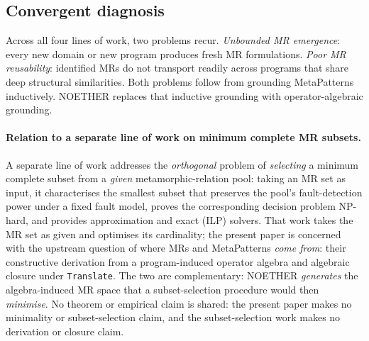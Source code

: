 \documentclass[acmsmall,screen,review]{acmart}
\begin{document}
\subsection{Convergent diagnosis}

Across all four lines of work, two problems recur. \emph{Unbounded MR emergence}: every new domain or new program produces fresh MR formulations. \emph{Poor MR reusability}: identified MRs do not transport readily across programs that share deep structural similarities. Both problems follow from grounding MetaPatterns inductively. NOETHER replaces that inductive grounding with operator-algebraic grounding.
\paragraph{Relation to a separate line of work on minimum complete MR subsets.}
A separate line of work addresses the
\emph{orthogonal} problem of \emph{selecting} a minimum complete subset from a
\emph{given} metamorphic-relation pool: taking an MR set as input, it
characterises the smallest subset that preserves the pool's fault-detection
power under a fixed fault model, proves the corresponding decision problem
NP-hard, and provides approximation and exact (ILP) solvers. That work takes
the MR set as given and optimises its cardinality; the present paper is
concerned with the upstream question of where MRs and MetaPatterns
\emph{come from}: their constructive derivation from a program-induced
operator algebra and algebraic closure under \texttt{Translate}. The two are
complementary: NOETHER \emph{generates} the algebra-induced MR space that a
subset-selection procedure would then \emph{minimise}. No theorem or empirical
claim is shared: the present paper makes no minimality or subset-selection
claim, and the subset-selection work makes no derivation or closure claim.
\end{document}
